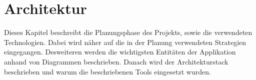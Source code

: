 \section{Architektur}\label{sec:architecture}

Dieses Kapitel beschreibt die Planungsphase des Projekts, sowie die verwendeten Technologien. Dabei wird näher auf die in der Planung verwendeten Strategien eingegangen. Desweiteren werden die wichtigsten Entitäten der Applikation anhand von Diagrammen beschrieben. Danach wird der Architekturstack beschrieben und warum die beschriebenen Tools eingesetzt wurden.



